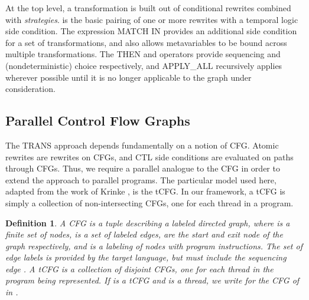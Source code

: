 \documentclass{eptcs}
\newcommand{\ignore}[1]{{}}
\newtheorem{definition}{Definition}
\begin{document}
At the top level, a transformation  is built out of conditional rewrites combined with \emph{strategies}.
 is the basic pairing of one or more rewrites with a temporal logic side condition.  The expression MATCH  IN  provides an additional side condition for a set of transformations, and also allows metavariables to be bound across multiple transformations.  The THEN and  operators provide sequencing and (nondeterministic) choice respectively, and APPLY\_ALL  recursively applies  wherever possible until it is no longer applicable to the graph under consideration.

\subsection{Parallel Control Flow Graphs}
\label{tcfg}
The TRANS approach depends fundamentally on a notion of \ac{CFG}.  Atomic rewrites are rewrites on \acp{CFG}, and \ac{CTL} side conditions are evaluated on paths through \acp{CFG}.  Thus, we require a parallel analogue to the \ac{CFG} in order to extend the approach to parallel programs.  The particular model used here, adapted from the work of Krinke \cite{tcfg}, is the \ac{tCFG}.  In our framework, a \ac{tCFG} is simply a collection of non-intersecting \acp{CFG}, one for each thread in a program. 

\begin{definition}
A \emph{\ac{CFG}} is a tuple  describing a labeled directed graph, where  is a finite set of nodes,  is a set of labeled edges,  are the start and exit node of the graph respectively, and  is a labeling of nodes with program instructions.  The set of edge labels  is provided by the target language, but must include the sequencing edge . A \emph{\ac{tCFG}} is a collection of disjoint \acp{CFG}, one for each thread in the program being represented.  If  is a \ac{tCFG} and  is a thread, we write  for the \ac{CFG} of  in .\end{definition}
\ignore{Here we see a second parameter that must be provided by the target language: a correspondence between instruction labels and outgoing edges. For instance, in most programming languages, an assignment statement should have only one outgoing edge, indicating the next instruction to be executed; a conditional branch statement, on the other hand, should have two outgoing edges, one clearly marked as belonging to each branch. Generalizing this correspondence as a parameter allows us to reason about \acp{CFG} and \acp{tCFG} independently of any particular programming language.}
\end{document}
